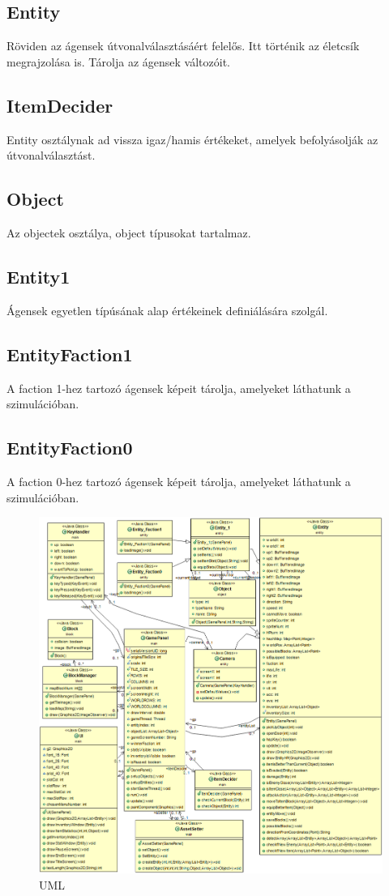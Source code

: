 \subsection{Entity}

Röviden az ágensek útvonalválasztásáért felelős. 
Itt történik az életcsík megrajzolása is.
Tárolja az ágensek változóit.

\subsection{ItemDecider}

Entity osztálynak ad vissza igaz/hamis értékeket, amelyek befolyásolják az útvonalválasztást.

\subsection{Object}

Az objectek osztálya, object típusokat tartalmaz.

\subsection{Entity1}

Ágensek egyetlen típúsának alap értékeinek definiálására szolgál.

\subsection{EntityFaction1}

A faction 1-hez tartozó ágensek képeit tárolja, amelyeket láthatunk a szimulációban.

\subsection{EntityFaction0}

A faction 0-hez tartozó ágensek képeit tárolja, amelyeket láthatunk a szimulációban.


\begin{figure}[!ht]
	\centering
	\includegraphics[scale=0.40]{images/UML.png}
	\caption{UML}
	\label{fig:UML}
\end{figure}
